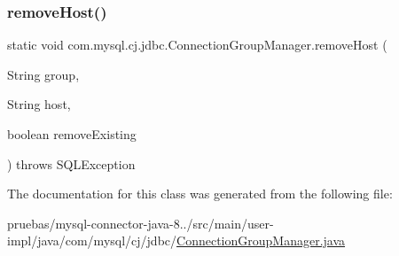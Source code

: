 \subsubsection{\texorpdfstring{remove\+Host()}{removeHost()}\hspace{0.1cm}{\footnotesize\ttfamily [2/2]}}
{\footnotesize\ttfamily static void com.\+mysql.\+cj.\+jdbc.\+Connection\+Group\+Manager.\+remove\+Host (\begin{DoxyParamCaption}\item[{String}]{group,  }\item[{String}]{host,  }\item[{boolean}]{remove\+Existing }\end{DoxyParamCaption}) throws S\+Q\+L\+Exception\hspace{0.3cm}{\ttfamily [static]}}



The documentation for this class was generated from the following file\+:\begin{DoxyCompactItemize}
\item 
pruebas/mysql-\/connector-\/java-\/8../src/main/user-\/impl/java/com/mysql/cj/jdbc/\mbox{\hyperlink{_connection_group_manager_8java}{Connection\+Group\+Manager.\+java}}\end{DoxyCompactItemize}
